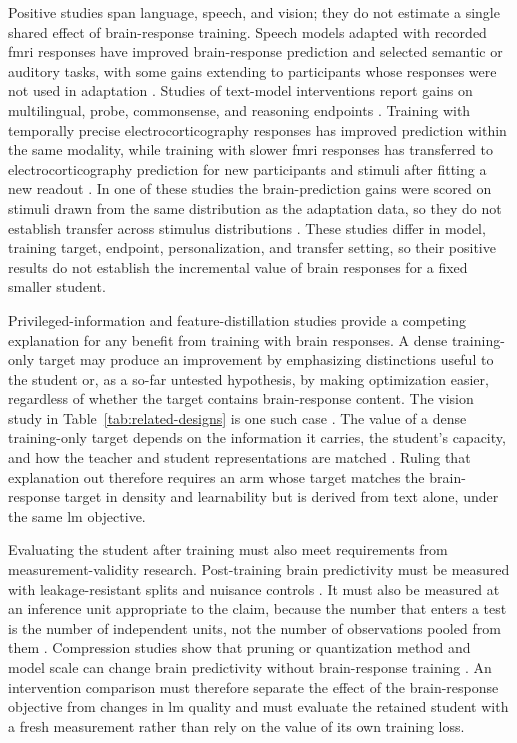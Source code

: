 Positive studies span language, speech, and vision; they do not estimate a single shared effect of brain-response training.
Speech models adapted with recorded \ac{fmri} responses have improved brain-response prediction and selected semantic or auditory tasks, with some gains extending to participants whose responses were not used in adaptation \autocite{moussa2025,moussa2025b,freteault2025}.
Studies of text-model interventions report gains on multilingual, probe, commonsense, and reasoning endpoints \autocite{negi2025,bilgin2026,merlinData2026,xiao2026}.
Training with temporally precise electrocorticography responses has improved prediction within the same modality, while training with slower \ac{fmri} responses has transferred to electrocorticography prediction for new participants and stimuli after fitting a new readout \autocite{zhang2026,vaidya2026}.
In one of these studies the brain-prediction gains were scored on stimuli drawn from the same distribution as the adaptation data, so they do not establish transfer across stimulus distributions \autocite{freteault2025}.
These studies differ in model, training target, endpoint, personalization, and transfer setting, so their positive results do not establish the incremental value of brain responses for a fixed smaller student.

Privileged-information and feature-distillation studies provide a competing explanation for any benefit from training with brain responses.
A dense training-only target may produce an improvement by emphasizing distinctions useful to the student or, as a so-far untested hypothesis, by making optimization easier, regardless of whether the target contains brain-response content.
The vision study in Table~\ref{tab:related-designs} is one such case \autocite{pirlot2022}.
The value of a dense training-only target depends on the information it carries, the student's capacity, and how the teacher and student representations are matched \autocite{lopezpaz2016,saadi2025}.
Ruling that explanation out therefore requires an arm whose target matches the brain-response target in density and learnability but is derived from text alone, under the same \ac{lm} objective.

Evaluating the student after training must also meet requirements from measurement-validity research.
Post-training brain predictivity must be measured with leakage-resistant splits and nuisance controls \autocite{hadidi2026,jia2026}.
It must also be measured at an inference unit appropriate to the claim, because the number that enters a test is the number of independent units, not the number of observations pooled from them \autocite{lazic2010}.
Compression studies show that pruning or quantization method and model scale can change brain predictivity without brain-response training \autocite{oota2026}.
An intervention comparison must therefore separate the effect of the brain-response objective from changes in \ac{lm} quality and must evaluate the retained student with a fresh measurement rather than rely on the value of its own training loss.

